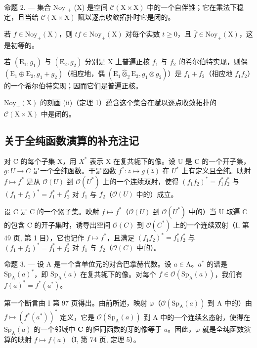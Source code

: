 命题 2. --- 集合 Noy \(_{+}\) (X) 是空间 \(\mathcal{C}(\text{X} \times \text{X})\) 中的一个自伴锥；它在乘法下稳定，且当给 \(\mathcal{C}(\text{X} \times \text{X})\) 赋以逐点收敛拓扑时它是闭的。

若 \(f \in \mathrm{Noy}_{+}(\mathrm{X})\)，则 \(tf \in \mathrm{Noy}_{+}(\mathrm{X})\) 对每个实数 \(t \geqslant 0\)，且 \(\overline{f} \in \mathrm{Noy}_{+}(\mathrm{X})\)，这是初等的。

若 \((\mathrm{E}_{1}, g_{1})\) 与 \((\mathrm{E}_{2}, g_{2})\) 分别是 X 上普遍正核 \(f_{1}\) 与 \(f_{2}\) 的希尔伯特实现，则偶 \((\mathrm{E}_{1} \oplus \mathrm{E}_{2}, g_{1} + g_{2})\)（相应地，偶 \((\mathrm{E}_{1} \widehat{\otimes}_{2} \mathrm{E}_{2}, g_{1} \otimes g_{2})\)）是 \(f_{1} + f_{2}\)（相应地 \(f_{1}f_{2}\)）的一个希尔伯特实现；因而它们是普遍正核。

\(\mathrm{Noy}_{+}(\mathrm{X})\) 的刻画 (ii)（定理 1）蕴含这个集合在赋以逐点收敛拓扑的 \(\mathcal{C}(\mathrm{X}\times\mathrm{X})\) 中是闭的。

\subsection{关于全纯函数演算的补充注记}

对 C 的每个子集 X，用 \(X^{*}\) 表示 X 在复共轭下的像。设 U 是 C 的一个开子集，\(g: U \to C\) 是一个全纯函数。于是函数 \(f^{*}: z \mapsto \overline{g(\overline{z})}\) 在 \(U^{*}\) 上有定义且全纯。映射 \(f \mapsto f^{*}\) 是从 \(\mathcal{O}(U)\) 到 \(\mathcal{O}(U^{*})\) 上的一个连续双射，使得 \((f_{1}f_{2})^{*} = f_{1}^{*}f_{2}^{*}\) 与 \((f_{1} + f_{2})^{*} = f_{1}^{*} + f_{2}^{*}\) 对 \(f_{1}\) 与 \(f_{2}\)（\(\mathcal{O}(U)\) 中的）成立。

设 C 是 C 的一个紧子集。映射 \(f \mapsto f^{*}\)（\(\mathcal{O}(U)\) 到 \(\mathcal{O}(U^{*})\) 中的）当 U 取遍 C 的包含 C 的开子集时，诱导出空间 \(\mathcal{O}(C)\) 到 \(\mathcal{O}(C^{*})\) 上的一个连续双射（I, 第 49 页, 第 1 目），它也记作 \(f \mapsto f^{*}\)，且满足 \((f_{1}f_{2})^{*} = f_{1}^{*}f_{2}^{*}\) 与 \((f_{1} + f_{2})^{*} = f_{1}^{*} + f_{2}^{*}\) 对 \(f_{1}\) 与 \(f_{2}\)（\(\mathcal{O}(C)\) 中的）。

命题 3. --- 设 A 是一个含单位元的对合巴拿赫代数。设 \(a \in \mathrm{A}\)。\(a^{*}\) 的谱是 \(\mathrm{Sp}_{\mathrm{A}}(a)^{*}\)，即 \(\mathrm{Sp}_{\mathrm{A}}(a)\) 在复共轭下的像。对每个 \(f \in \mathcal{O}(\mathrm{Sp}_{\mathrm{A}}(a))\)，我们有 \(f(a)^{*} = f^{*}(a^{*})\)。

第一个断言由 I 第 97 页得出。由前所述，映射 \(\varphi\)（\(\mathcal{O}(\mathrm{Sp}_{\mathrm{A}}(a))\) 到 A 中的）由 \(f \mapsto (f^{*}(a^{*}))^{*}\) 定义，它是 \(\mathcal{O}(\mathrm{Sp}_{\mathrm{A}}(a))\) 到 A 中的一个连续幺态射，使得在 \(\mathrm{Sp}_{\mathrm{A}}(a)\) 的一个邻域中 \(\mathbf{C}\) 的恒同函数的芽的像等于 \(a\)。因此，\(\varphi\) 就是全纯函数演算的映射 \(f \mapsto f(a)\)（I, 第 74 页, 定理 5）。

